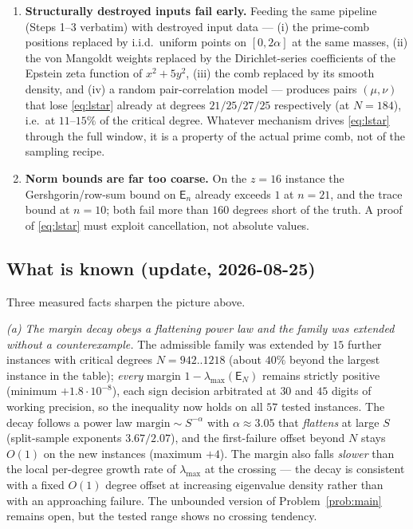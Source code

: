 \documentclass[11pt]{article}
\theoremstyle{remark}
\newcommand{\E}{\mathsf{E}}
\begin{document}
\begin{enumerate}
$N$ has the census distribution
$\{0\!:\!18,\ 1\!:\!10,\ 2\!:\!6,\ 3\!:\!6,\ 4\!:\!1,\ 5\!:\!1\}$
over the $42$ instances.  For $z=16$ the failure is immediate:
$\lambda_{\max}(\E_{185})=1.00003660>1$.
\item \textbf{Structurally destroyed inputs fail early.}  Feeding the
same pipeline (Steps 1--3 verbatim) with destroyed input data ---
(i) the prime-comb positions replaced by i.i.d.\ uniform points on
$[0,2\alpha]$ at the same masses, (ii) the von Mangoldt weights
replaced by the Dirichlet-series coefficients of the Epstein zeta
function of $x^{2}+5y^{2}$, (iii) the comb replaced by its smooth
density, and (iv) a random pair-correlation model --- produces pairs
$(\mu,\nu)$ that lose \eqref{eq:lstar} already at degrees
$21/25/27/25$ respectively (at $N=184$), i.e.\ at $11$--$15\%$ of the
critical degree.  Whatever mechanism drives \eqref{eq:lstar} through
the full window, it is a property of the actual prime comb, not of
the sampling recipe.
\item \textbf{Norm bounds are far too coarse.}  On the $z=16$
instance the Gershgorin/row-sum bound on $\E_{n}$ already exceeds
$1$ at $n=21$, and the trace bound at $n=10$; both fail more than
$160$ degrees short of the truth.  A proof of \eqref{eq:lstar} must
exploit
cancellation, not absolute values.
\end{enumerate}

\subsection*{What is known (update, 2026-08-25)}

Three measured facts sharpen the picture above.

\emph{(a) The margin decay obeys a flattening power law and the family
was extended without a counterexample.}  The admissible family was
extended by $15$ further instances with critical degrees
$N=942..1218$ (about $40\%$ beyond the largest instance in the table);
\emph{every} margin $1-\lambda_{\max}(\E_{N})$ remains strictly
positive (minimum $+1.8\cdot10^{-8}$), each sign decision arbitrated
at $30$ and $45$ digits of working precision, so the inequality now
holds on all $57$ tested instances.  The decay follows a power law
$\mathrm{margin}\sim S^{-\alpha}$ with $\alpha\approx3.05$ that
\emph{flattens} at large $S$ (split-sample exponents $3.67/2.07$), and
the first-failure offset beyond $N$ stays $O(1)$ on the new instances
(maximum $+4$).  The margin also falls \emph{slower} than the local
per-degree growth rate of $\lambda_{\max}$ at the crossing --- the
decay is consistent with a fixed $O(1)$ degree offset at increasing
eigenvalue density rather than with an approaching failure.  The
unbounded version of Problem~\ref{prob:main} remains open, but the
tested range shows no crossing tendency.
\end{document}
